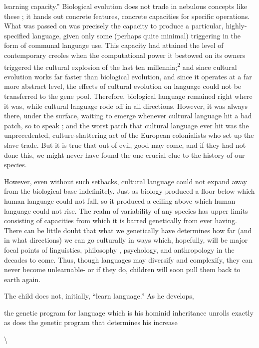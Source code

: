 learning capacity.'' Biological evolution does not trade in nebulous concepts like these ; it hands out concrete features, concrete capacities for specific operations. What was passed on was precisely the capacity to produce a particular, highly-specified language, given only some (perhaps quite minimal) triggering in the form of communal language use. This capacity had attained the level of contemporary creoles when the computational power it bestowed on its owners triggered the cultural explosion of the last ten millennia;\textsuperscript{2} and since cultural evolu\-tion works far faster than biological evolution, and since it operates at a far more abstract level, the effects of cultural evolution on language could not be transferred to the gene pool. Therefore, biological lan\-guage remained right where it was, while cultural language rode off in all directions. However, it was always there, under the surface, waiting to emerge whenever cultural language hit a bad patch, so to speak ; and the worst patch that cultural language ever hit was the unprece\-dented, culture-shattering act of the European colonialists who set up the slave trade. But it is true that out of evil, good may come, and if they had not done this, we might never have found the one crucial clue to the history of our species.

However, even without such setbacks, cultural language could not expand away from the biological base indefinitely. Just as biology produced a floor below which human language could not fall, so it produced a ceiling above which human language could not rise. The realm of variability of any species has upper limits consisting of capa\-cities from which it is barred genetically from ever having. There can be little doubt that what we genetically have determines how far (and in what directions) we can go culturally in ways which, hopefully, will be major focal points of linguistics, philosophy , psychology, and anthropology in the decades to come. Thus, though languages may diversify and complexify, they can never become unlearnable- or if they do, children will soon pull them back to earth again.

The child does not, initially, ``learn language.'' As he develops,

the genetic program for language which is his hominid inheritance unrolls exactly as does the genetic program that determines his increase

{\textbackslash}


